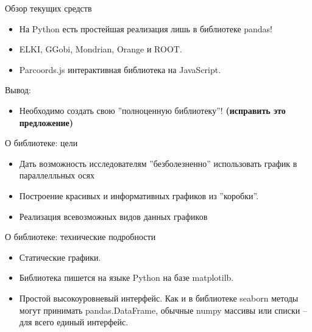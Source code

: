 \documentclass[fleqn, xcolor=x11names]{beamer}
\begin{document}
\begin{frame}{Обзор текущих средств}
    \begin{itemize}
        \item На Python есть простейшая реализация лишь в библиотеке pandas!
        \item ELKI, GGobi, Mondrian, Orange и ROOT.
        \item Parcoords.js интерактивная библиотека на JavaScript.
    \end{itemize}

    \vspace{30px}
    Вывод:
    \begin{itemize}
        \item Необходимо создать свою ''полноценную библиотеку''! \textbf{(исправить это предложение)}
    \end{itemize}

\end{frame}

\begin{frame}{О библиотеке: цели}
    \begin{itemize}
        \item Дать возможность исследователям ''безболезненно'' использовать график 
        в параллелльных осях
        \item Построение красивых и информативных графиков из ''коробки''.
        \item Реализация всевозможных видов данных графиков
    \end{itemize}
\end{frame} 

\begin{frame}{О библиотеке: технические подробности}
    \begin{itemize}
        \item Статические графики.
        \item Библиотека пишется на языке Python на базе matplotilb.       
        \item Простой высокоуровневый интерфейс. Как и в библиотеке seaborn методы могут принимать pandas.DataFrame,
        обычные numpy массивы или списки -- для всего единый интерфейс.
    \end{itemize}
\end{frame}
\end{document}
